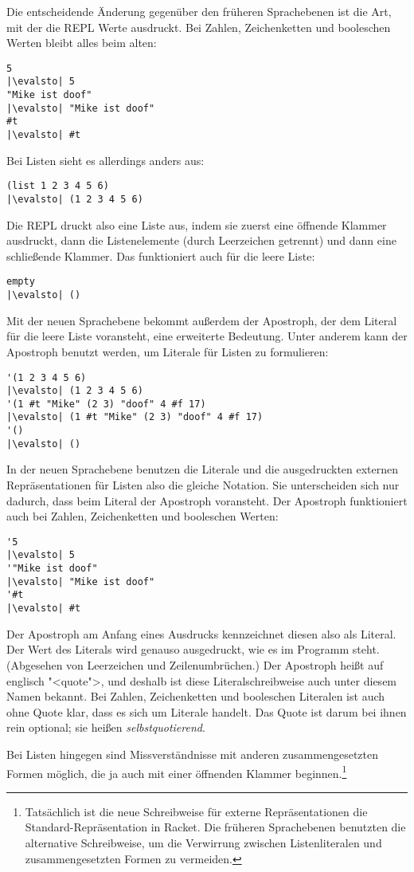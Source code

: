 Die entscheidende Änderung gegenüber den früheren Sprachebenen ist
die Art, mit der die REPL Werte ausdruckt.  Bei Zahlen, Zeichenketten
und booleschen Werten bleibt alles beim alten:
%
\begin{lstlisting}
5
|\evalsto| 5
"Mike ist doof"
|\evalsto| "Mike ist doof"
#t
|\evalsto| #t
\end{lstlisting}
%
Bei Listen sieht es allerdings anders aus:
%
\begin{lstlisting}
(list 1 2 3 4 5 6)
|\evalsto| (1 2 3 4 5 6)
\end{lstlisting}
%
Die REPL druckt also eine Liste aus, indem sie zuerst eine öffnende
Klammer ausdruckt, dann die Listenelemente (durch Leerzeichen
getrennt) und dann eine schließende Klammer.
Das funktioniert auch für die leere Liste:
%
\begin{lstlisting}
empty
|\evalsto| ()
\end{lstlisting}
%
Mit der neuen Sprachebene bekommt außerdem der Apostroph, der dem
Literal für die leere Liste voransteht, eine erweiterte Bedeutung.
Unter anderem kann der Apostroph benutzt werden, um Literale für
Listen zu formulieren:
%
\begin{lstlisting}
'(1 2 3 4 5 6)
|\evalsto| (1 2 3 4 5 6)
'(1 #t "Mike" (2 3) "doof" 4 #f 17)
|\evalsto| (1 #t "Mike" (2 3) "doof" 4 #f 17)
'()
|\evalsto| ()
\end{lstlisting}
%
In der neuen Sprachebene benutzen die Literale und die ausgedruckten
externen Repräsentationen für Listen also die gleiche
Notation.  Sie unterscheiden sich nur dadurch,
dass beim Literal der Apostroph voransteht.  Der Apostroph funktioniert
auch bei Zahlen, Zeichenketten und booleschen Werten:
%
\begin{lstlisting}
'5
|\evalsto| 5
'"Mike ist doof"
|\evalsto| "Mike ist doof"
'#t
|\evalsto| #t
\end{lstlisting}
%
Der Apostroph am Anfang eines Ausdrucks
kennzeichnet diesen also als Literal.  Der Wert des Literals wird 
genauso ausgedruckt, wie es im Programm steht.  (Abgesehen von
Leerzeichen und Zeilenumbrüchen.)  Der Apostroph heißt auf englisch
"<quote">, und deshalb ist diese
Literalschreibweise auch unter diesem Namen bekannt.  Bei Zahlen,
Zeichenketten und booleschen Literalen ist auch ohne Quote klar, dass
es sich um Literale handelt.  Das Quote ist darum bei ihnen rein
optional; sie heißen 
\textit{selbstquotierend}.

Bei Listen hingegen sind Missverständnisse mit anderen
zusammengesetzten Formen möglich, die ja auch mit einer öffnenden Klammer
beginnen.\footnote{Tatsächlich ist die neue Schreibweise für externe
  Repräsentationen die Standard-Repräsentation in Racket.  Die
  früheren Sprachebenen benutzten die alternative Schreibweise, um die
  Verwirrung zwischen Listenliteralen und zusammengesetzten Formen zu
  vermeiden.} 

